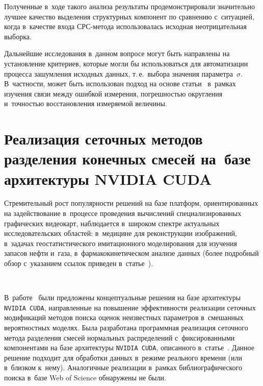 \begin{multicols}{2}
Полученные в~ходе такого анализа результаты продемонстрировали значительно 
лучшее качество выделения структурных компонент по сравнению с~ситуацией, 
когда в~качестве входа СРС-ме\-то\-да использовалась исходная неотрицательная вы\-борка. 
{

}

Дальнейшие исследования в~данном вопросе могут быть направлены на установление 
критериев, которые могли бы использоваться для автоматизации процесса зашумления 
исходных данных, т.\,е.\ выбора значения параметра~$\sigma$. В~част\-ности, 
может быть использован подход на основе статьи~\cite{Ushakov2015} в~рамках 
изучения связи между ошибкой измерения, погрешностью округления и~точностью 
восстановления измеряемой величины.

\vspace*{-9pt}

\section{Реализация сеточных методов разделения конечных смесей 
на~базе архитектуры NVIDIA CUDA}

\vspace*{-2pt}


Стремительный рост популярности решений на базе платформ, ориентированных 
на задействование в~процессе проведения вычислений специализированных графических 
видеокарт, наблюдается в~широком спектре актуальных исследовательских областей: 
в~медицине для реконструкции изображений, в~задачах геостатистического имитационного 
моделирования для изучения запасов нефти и~газа, в~фармакокинетическом анализе данных 
(более подробный обзор с~указанием ссылок приведен в~статье~\cite{Gorshenin2016CUDA}). 

\begin{figure*}[b] %
\vspace*{-8pt}
\begin{center}
\mbox{%
\epsfxsize=109.871mm
}
\end{center}
\vspace*{-13pt}
\label{FigARIMAX} 
\end{figure*}


В~работе~\cite{Gorshenin2015ICNAAM1} были предложены концептуальные решения 
на базе архитектуры \verb"NVIDIA CUDA", направленные на повышение эффективности 
реализации сеточных модификаций методов поиска оценок неизвестных параметров 
в~смешанных вероятностных моделях. Была разработана про\-грам\-мная реализация 
сеточного метода разделения смесей нормальных распределений с~фиксированными 
компонентами на базе архитектуры \verb"NVIDIA CUDA", описанного 
в~статье~\cite{22-a}. Данное решение подходит для обработки 
данных в~режиме реального времени (или в~близком к~нему). Аналогичные реализации 
в~рамках библиографического поиска в~базе Web of Science обнаружены не были.


\end{multicols}
